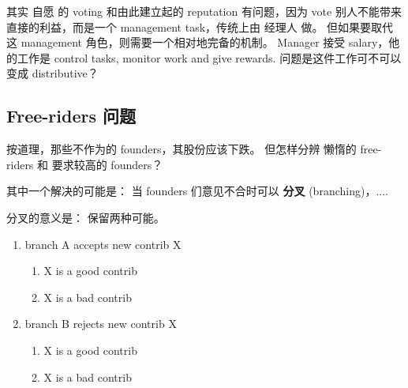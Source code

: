 \documentclass[12pt, orivec]{article}
\newcommand{\cc}[2]{#1}
\newcommand{\cc}[2]{#2}
\begin{document}
\cc{
其实 自愿 的 voting 和由此建立起的 reputation 有问题，因为 vote 别人不能带来直接的利益，而是一个 management task，传统上由 经理人 做。  但如果要取代这 management 角色，则需要一个相对地完备的机制。   Manager 接受 salary，他的工作是 control tasks, monitor work and give rewards.   问题是这件工作可不可以变成 distributive？  }{
There may be a problem with basing reputation upon voluntary votes.  Voting for someone does not benefit the voter;  This is a management task traditionally done by managers.  If we want to replace such a role, we need an adequate mechanism.  The traditional manager gets paid, and his responsibility is to control tasks, monitor work, and give rewards.  The question is whether this job can be decentralized?
}


\secttoc
\subsection{\cc{Free-riders 问题}{The problem of free-riders}}

\cc{
按道理，那些不作为的 founders，其股份应该下跌。  但怎样分辨 懒惰的 free-riders 和 要求较高的 founders？
}{
In principle, if a founder hoards shares without performing useful work, his shares in the company should be reduced.	 But how could we distinguish between lazy free-riders and someone who has high standards for other people's work?
}

\cc{
其中一个解决的可能是： 当 founders 们意见不合时可以 \textbf{分叉} (branching)，....
}{
A possible solution is via \textbf{branching} when founders disagree with each other.
}

\cc{
分叉的意义是： 保留两种可能。 
}{
The essence of branching is:  to preserve both options in a disagreement.
}

\begin{enumerate}
	\item branch A accepts new contrib X
	\begin{enumerate}
		\item X is a good contrib
		\item X is a bad contrib
	\end{enumerate}
	\item branch B rejects new contrib X
	\begin{enumerate}
		\item X is a good contrib
		\item X is a bad contrib
	\end{enumerate}
\end{enumerate}
\end{document}
